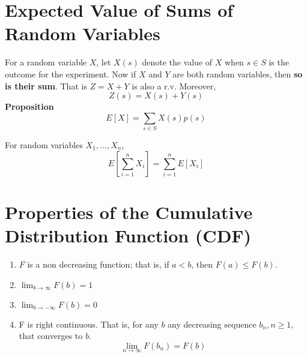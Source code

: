 \section{Expected Value of Sums of Random Variables}
For a random variable $X$, let $X(s)$ denote the value of $X$ when $s\in S$ is the outcome for the experiment. Now if $X$ and $Y$ are both random variables, then \textbf{so is their sum}. That is $Z = X + Y$ is also a r.v. Moreover, \[Z(s) = X(s) + Y(s)\]
\textbf{Proposition}
\[E[X] = \sum_{s\in S} X(s)p(s)\]
\begin{corollary}
For random variables $X_1, \dots, X_n$, \[E\left[\sum^n_{i=1} X_i\right] = \sum^n_{i=1} E[X_i]\]
\section{Properties of the Cumulative Distribution Function (CDF)}
\begin{enumerate}
    \item $F$ is a non decreasing function; that is, if $a < b$, then $F(a)\leq F(b)$.
    \item $\lim_{b\rightarrow\infty} F(b) = 1$
    \item $\lim_{b\rightarrow -\infty} F(b) = 0$
    \item F is right continuous. That is, for any $b$ any decreasing sequence $b_n, n\geq 1$, that converges to $b$. \[\lim_{n\rightarrow\infty} F(b_n) = F(b)\]
\end{enumerate}
\end{corollary}